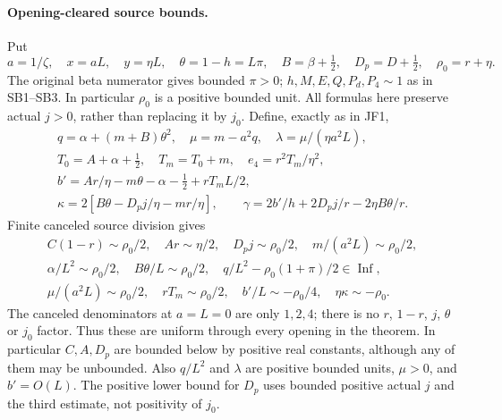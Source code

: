 \paragraph{Opening-cleared source bounds.}
Put
\[
 a=1/\zeta,\quad x=aL,\quad y=\eta L,\quad
 \theta=1-h=L\pi,\quad B=\beta+\tfrac12,\quad D_p=D+\tfrac12,
 \quad \rho_0=r+\eta.
\]
The original beta numerator gives bounded $\pi>0$;
$h,M,E,Q,P_d,P_4\sim1$ as in SB1--SB3. In particular
$\rho_0$ is a positive bounded unit. All formulas here preserve
actual $j>0$, rather than replacing it by $j_0$.
Define, exactly as in JF1,
\[
\begin{gathered}
 q=\alpha+(m+B)\theta^2,\quad \mu=m-a^2q,\quad
 \lambda=\mu/(\eta a^2L),\\
 T_0=A+\alpha+\tfrac12,\quad T_m=T_0+m,\quad
 e_4=r^2T_m/\eta^2,\\
 b'=Ar/\eta-m\theta-\alpha-\tfrac12+rT_mL/2,\\
 \kappa=2[B\theta-D_pj/\eta-mr/\eta],\qquad
 \gamma=2b'/h+2D_pj/r-2\eta B\theta/r.
\end{gathered}                                                    \tag{EU1}
\]
Finite canceled source division gives
\[
\begin{gathered}
 C(1-r)\sim\rho_0/2,\quad Ar\sim\eta/2,\quad
 D_pj\sim\rho_0/2,\quad m/(a^2L)\sim\rho_0/2,\\
 \alpha/L^2\sim\rho_0/2,\quad B\theta/L\sim\rho_0/2,
 \quad q/L^2-\rho_0(1+\pi)/2\in\operatorname{Inf},\\
 \mu/(a^2L)\sim\rho_0/2,\quad rT_m\sim\rho_0/2,
 \quad b'/L\sim-\rho_0/4,\quad \eta\kappa\sim-\rho_0.
\end{gathered}                                                    \tag{EU2}
\]
The canceled denominators at $a=L=0$ are only $1,2,4$;
there is no $r$, $1-r$, $j$, $\theta$ or $j_0$ factor.
Thus these are uniform through every opening in the theorem.
In particular $C,A,D_p$ are bounded below by positive real constants,
although any of them may be unbounded. Also $q/L^2$ and $\lambda$
are positive bounded units, $\mu>0$, and $b'=O(L)$.
The positive lower bound for $D_p$ uses bounded positive actual $j$
and the third estimate, not positivity of $j_0$.

